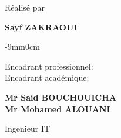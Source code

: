 \begin{center}
\textrm{Réalisé par}\\
\vskip0.3cm
        \begin{center}
            \large\textbf{Sayf}
            \large\textbf{ZAKRAOUI }
        \end{center}
    

\vskip12mm


\begin{changemargin}{-9mm}{0cm}
\begin{minipage}[l]{1.1\columnwidth}
\begin{tcolorbox}[colframe=isiBlue,colback=white,boxrule=0pt,toprule=3pt,bottomrule=3pt,arc=0pt,top=0mm,right=0mm,left=0mm,bottom=0mm,boxsep=0.5mm]{
    \begin{tcolorbox}[colframe=isiBlue,colback=white, boxrule=0pt,toprule=1pt,bottomrule=1pt,arc=0pt,enlarge bottom by=-0.9mm, auto outer arc]
        \centering
        {\huge\textbf{\@title}}
    \end{tcolorbox}
}
\end{tcolorbox}
\end{minipage}
\end{changemargin}

\end{center}
\vskip8mm%

\begin{center}
\large
\begin{minipage}[c]{0.28\columnwidth}
Encadrant professionnel:\\
Encadrant académique:
\end{minipage}
\hfill
\begin{minipage}[c]{0.42\columnwidth}
\textbf{Mr Said BOUCHOUICHA}\\
\textbf{Mr Mohamed ALOUANI}
\end{minipage}
\hfill
\begin{minipage}[c]{0.26\columnwidth}
Ingenieur IT\\
\@academicFramerSpeciality
\end{minipage}
\end{center}
\vskip16mm

\afterpage{\blankpage}